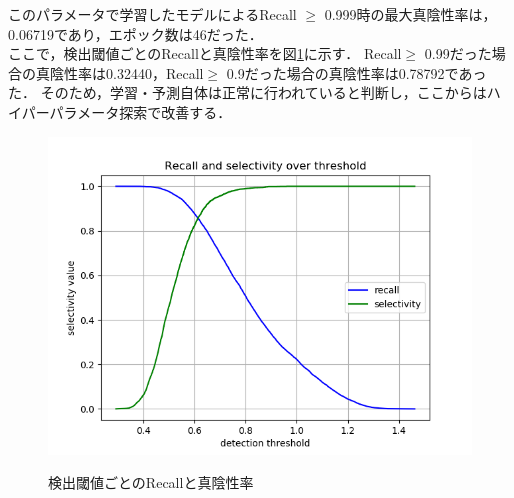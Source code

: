 \documentclass[10pt]{jarticle}
\begin{document}
このパラメータで学習したモデルによるRecall $\ge$ 0.999時の最大真陰性率は，0.06719であり，エポック数は46だった．\\
\quad ここで，検出閾値ごとのRecallと真陰性率を図\ref{tnrateInit}に示す．
Recall$\ge$ 0.99だった場合の真陰性率は0.32440，Recall$\ge$ 0.9だった場合の真陰性率は0.78792であった．
そのため，学習・予測自体は正常に行われていると判断し，ここからはハイパーパラメータ探索で改善する．

\begin{figure}[H]
  \centering
  \includegraphics[width=12cm]{tnrate_init.png}
  \label{tnrateInit}
  \caption{検出閾値ごとのRecallと真陰性率}
\end{figure}
\end{document}
